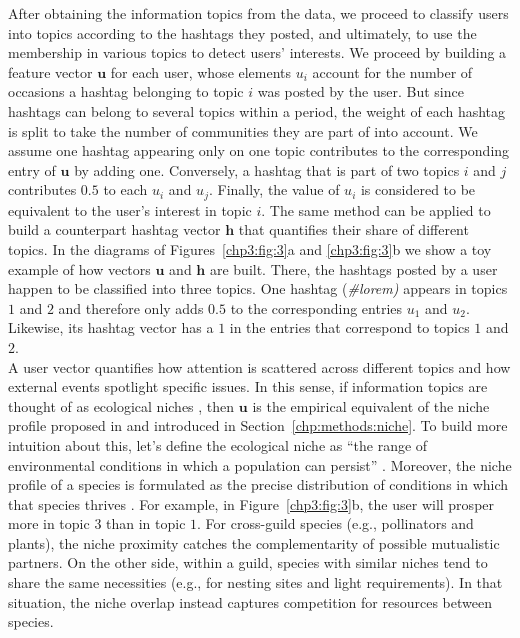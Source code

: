After obtaining the information topics from the data, we proceed to classify users into topics according to the hashtags they posted,
and ultimately,  to use the membership in various topics to detect users' interests. We proceed by building a feature vector $\mathbf{u}$ for each user, whose elements $u_i$ account for the number of occasions a hashtag belonging to topic $i$ was posted by the user. But since hashtags can belong to several topics within a period, the weight of each hashtag is split to take the number of communities they are part of into account. We assume one hashtag appearing only on one topic contributes to the corresponding entry of $\mathbf{u}$ by adding one. Conversely, a hashtag that is part of two topics $i$ and $j$  contributes $0.5$ to each $u_i$ and $u_j$. Finally, the value of $u_i$ is considered to be equivalent to the user's interest in topic $i$. The same method can be applied to build a counterpart hashtag vector $\mathbf{h}$ that quantifies their share of different topics.  In the diagrams of Figures~\ref{chp3:fig:3}a and \ref{chp3:fig:3}b we show a toy example of how vectors $\mathbf{u}$ and $\mathbf{h}$ are built. There, the hashtags posted by a user happen to be classified into three topics. One hashtag (\textit{\#lorem)} appears in topics $1$ and $2$ and therefore only adds $0.5$ to the corresponding entries $u_1$ and $u_2$. Likewise, its hashtag vector has a $1$ in the entries that correspond to topics $1$ and $2$. \\
 
A user vector quantifies how attention is scattered across different topics and how external events spotlight specific issues. In this sense, if information topics are thought of as ecological niches \cite{williams2000niche}, then $\mathbf{u}$ is the empirical equivalent of the niche profile proposed in \cite{cai2021niches,palazzi2021ecological} and introduced in Section~\ref{chp:methods:niche}. To build more intuition about this, let's define the ecological niche as ``the range of environmental conditions in which a population can persist'' \cite{hutchinson1957concluding}. Moreover, the niche profile of a species is formulated as the precise distribution of conditions in which that species thrives  \cite{williams2000niche}. For example, in Figure~\ref{chp3:fig:3}b, the user will prosper more in topic $3$ than in topic $1$. For cross-guild species (e.g., pollinators and plants), the niche proximity catches the complementarity of possible mutualistic partners. On the other side, within a guild, species with similar niches tend to share the same necessities (e.g., for nesting sites and light requirements). In that situation, the niche overlap instead captures competition for resources between species.\\


